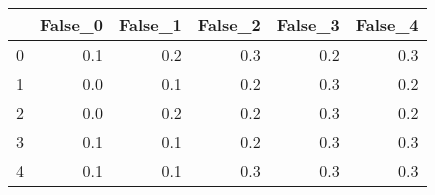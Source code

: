 \begin{tabular}{lrrrrr}
\toprule
{} &  False\_0 &  False\_1 &  False\_2 &  False\_3 &  False\_4 \\ \hline
\midrule
0 &      0.1 &      0.2 &      0.3 &      0.2 &      0.3 \\ \hline
1 &      0.0 &      0.1 &      0.2 &      0.3 &      0.2 \\ \hline
2 &      0.0 &      0.2 &      0.2 &      0.3 &      0.2 \\ \hline
3 &      0.1 &      0.1 &      0.2 &      0.3 &      0.3 \\ \hline
4 &      0.1 &      0.1 &      0.3 &      0.3 &      0.3 \\ \hline
\bottomrule
\end{tabular}
